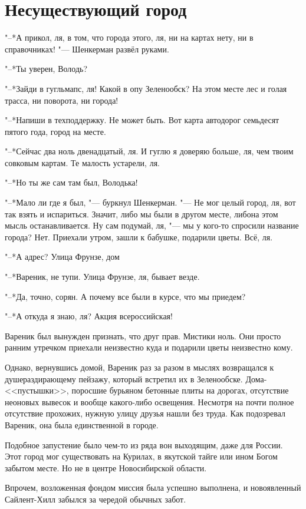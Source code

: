 \section{Несуществующий город}

"--*А прикол, ля, в том, что города этого, ля, ни на картах нету, ни в справочниках! "--- Шенкерман развёл руками.

"--*Ты уверен, Володь?

"--*Зайди в гугльмапс, ля!
Какой в опу Зеленообск?
На этом месте лес и голая трасса, ни поворота, ни города!

"--*Напиши в техподдержку.
Не может быть.
Вот карта автодорог семьдесят пятого года, город на месте.

"--*Сейчас два ноль двенадцатый, ля.
И гуглю я доверяю больше, ля, чем твоим совковым картам.
Те малость устарели, ля.

"--*Но ты же сам там был, Володька!

"--*Мало ли где я был, "--- буркнул Шенкерман.
"--- Не мог целый город, ля, вот так взять и испариться. 
Значит, либо мы были в другом месте, либо\ldotst на этом мысль останавливается. 
Ну сам подумай, ля, "--- мы у кого-то спросили название города?
Нет.
Приехали утром, зашли к бабушке, подарили цветы.
Всё, ля.

"--*А адрес?
Улица Фрунзе, дом\ldotst

"--*Вареник, не тупи.
Улица Фрунзе, ля, бывает везде.

"--*Да, точно, сорян.
А почему все были в курсе, что мы приедем?

"--*А откуда я знаю, ля?
Акция всероссийская!

Вареник был вынужден признать, что друг прав.
Мистики ноль. 
Они просто ранним утречком приехали неизвестно куда и подарили цветы неизвестно кому.

Однако, вернувшись домой, Вареник раз за разом в мыслях возвращался к душераздирающему пейзажу, который встретил их в Зеленообске.
Дома-<<пустышки>>, поросшие бурьяном бетонные плиты на дорогах, отсутствие неоновых вывесок и вообще какого-либо освещения.
Несмотря на почти полное отсутствие прохожих, нужную улицу друзья нашли без труда.
Как подозревал Вареник, она была единственной в городе.

Подобное запустение было чем-то из ряда вон выходящим, даже для России.
Этот город мог существовать на Курилах, в якутской тайге или ином Богом забытом месте.
Но не в центре Новосибирской области.

Впрочем, возложенная фондом миссия была успешно выполнена, и новоявленный Сайлент-Хилл забылся за чередой обычных забот.

